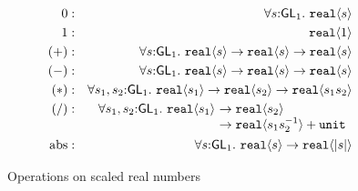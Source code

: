 \begin{figure}[t]
  \centering
  \begin{eqnarray*}
    0   &:& \forall s \mathord:\SynGL{1}.\ \tyPrim{real}{s} \\
    1   &:& \tyPrim{real}{1} \\
    (+) &:& \forall s \mathord:\SynGL{1}.\ \tyPrim{real}{s} \to \tyPrim{real}{s} \to \tyPrim{real}{s} \\
    (-) &:& \forall s \mathord:\SynGL{1}.\ \tyPrim{real}{s} \to \tyPrim{real}{s} \to \tyPrim{real}{s} \\
    (*) &:& \forall s_1,s_2 \mathord:\SynGL{1}.\ \tyPrim{real}{s_1} \to \tyPrim{real}{s_2} \to \tyPrim{real}{s_1s_2} \\
    (/) &:&
    \begin{array}[t]{@{}l@{}l}
      \forall s_1,s_2 \mathord:\SynGL{1}.\ \tyPrim{real}{s_1}\ & \to \tyPrim{real}{s_2} \\
      &\to \tyPrim{real}{s_1s_2^{-1}} + \tyPrimNm{unit} \\
    \end{array}\\
    \mathrm{abs} &:& \forall s \mathord:\SynGL{1}.\ \tyPrim{real}{s} \to \tyPrim{real}{\abs{s}} %
  \end{eqnarray*}
  \caption{Operations on scaled real numbers}
  \label{fig:real-ops}
\end{figure}

